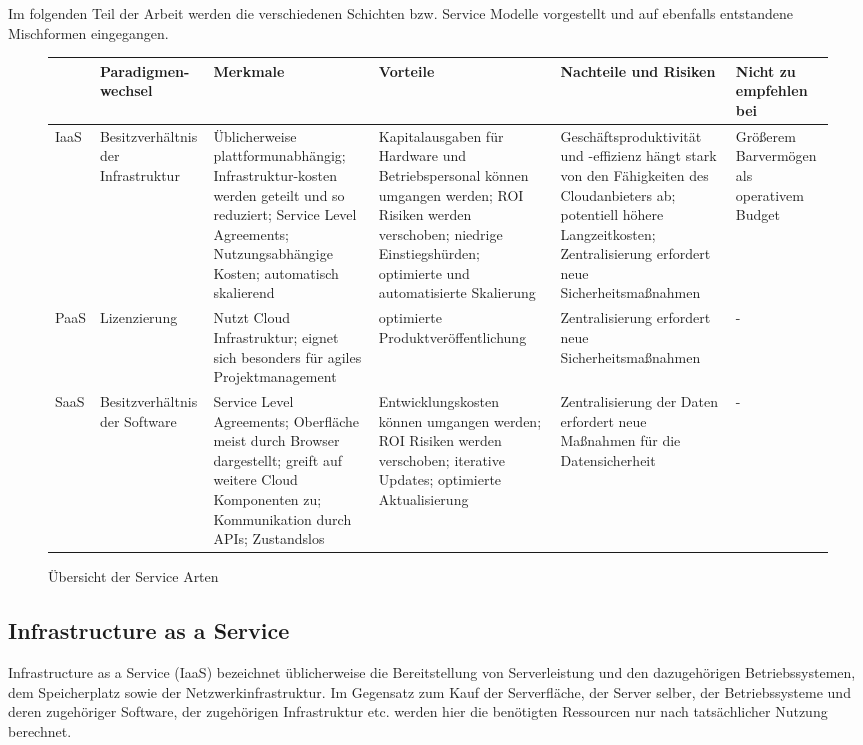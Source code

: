 Im folgenden Teil der Arbeit werden die verschiedenen Schichten bzw. Service Modelle vorgestellt und auf ebenfalls entstandene Mischformen eingegangen.

\begin{figure}
	\centering
	\caption{Übersicht der Service Arten}
	\label{serivceModelsTable}
	\begin{tabular}{|l|>{\RaggedRight}p{2cm}|>{\RaggedRight}p{3cm}|>{\RaggedRight}p{3cm}|>{\RaggedRight}p{3cm}|>{\RaggedRight}p{3cm}|}
		\hline
		\rule[-2ex]{0pt}{5.5ex} & \textbf{Paradigmen- wechsel} & \textbf{Merkmale} & \textbf{Vorteile} & \textbf{Nachteile \newline und Risiken} & \textbf{Nicht zu empfehlen bei} \\ 
		\hline
		\rule[-2ex]{0pt}{5.5ex} IaaS & Besitzverhältnis der Infrastruktur & Üblicherweise plattformunabhängig; Infrastruktur-kosten werden geteilt und so reduziert; Service Level Agreements; Nutzungsabhängige Kosten; automatisch skalierend & Kapitalausgaben für Hardware und Betriebspersonal können umgangen werden; ROI Risiken werden verschoben; niedrige Einstiegshürden; optimierte und automatisierte Skalierung & Geschäftsproduktivität und -effizienz hängt stark von den Fähigkeiten des Cloudanbieters ab; potentiell höhere Langzeitkosten; Zentralisierung erfordert neue Sicherheitsmaßnahmen & Größerem Barvermögen als operativem Budget \\ 
		\hline
		\rule[-2ex]{0pt}{5.5ex} PaaS & Lizenzierung & Nutzt Cloud Infrastruktur; eignet sich besonders für agiles Projektmanagement & optimierte Produktveröffentlichung & Zentralisierung erfordert neue Sicherheitsmaßnahmen & - \\ 
		\hline
		\rule[-2ex]{0pt}{5.5ex} SaaS & Besitzverhältnis der Software & Service Level Agreements; Oberfläche meist durch Browser dargestellt; greift auf weitere Cloud Komponenten zu; Kommunikation durch APIs; Zustandslos & Entwicklungskosten können umgangen werden; ROI Risiken werden verschoben; iterative Updates; optimierte Aktualisierung & Zentralisierung der Daten erfordert neue Maßnahmen für die Datensicherheit & - \\ 
		\hline 
	\end{tabular}
\end{figure}
 
 
\subsection{Infrastructure as a Service}
Infrastructure as a Service (IaaS) bezeichnet üblicherweise die Bereitstellung von Serverleistung und den dazugehörigen Betriebssystemen, dem Speicherplatz sowie der Netzwerkinfrastruktur. Im Gegensatz zum Kauf der Serverfläche, der Server selber, der Betriebssysteme und deren zugehöriger Software, der zugehörigen Infrastruktur etc. werden hier die benötigten Ressourcen nur nach tatsächlicher Nutzung berechnet.


